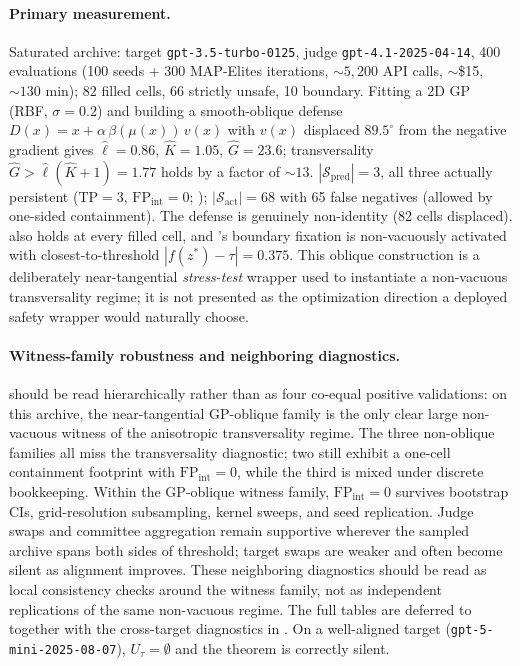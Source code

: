 \documentclass[11pt]{article}
\begin{document}
\paragraph{Primary measurement.}
Saturated archive: target \texttt{gpt-3.5-turbo-0125}, judge
\texttt{gpt-4.1-2025-04-14}, 400 evaluations (100 seeds + 300
MAP-Elites iterations, $\sim 5{,}200$ API calls, $\sim$\$15,
$\sim 130$ min); 82 filled cells, 66 strictly unsafe, 10 boundary.
Fitting a 2D GP (RBF, $\sigma=0.2$) and building a smooth-oblique
defense $D(x) = x + \alpha\,\beta(\mu(x))\,v(x)$ with $v(x)$ displaced
$89.5^\circ$ from the negative gradient gives
$\hat\ell = 0.86$, $\hat K = 1.05$, $\hat G = 23.6$; transversality
$\hat G > \hat\ell(\hat K{+}1) = 1.77$ holds by a factor of $\sim13$.
$|\mathcal{S}_{\text{pred}}| = 3$, all three actually persistent
($\mathrm{TP}=3$, $\mathrm{FP}_{\mathrm{int}}=0$;
); $|\mathcal{S}_{\text{act}}| = 68$
with 65 false negatives (allowed by one-sided containment). The defense
is genuinely non-identity (82 cells displaced). 
also holds at every filled cell, and 's boundary
fixation is non-vacuously activated with closest-to-threshold
$|f(z^*)-\tau| = 0.375$.
This oblique construction is a deliberately near-tangential
\emph{stress-test} wrapper used to instantiate a non-vacuous
transversality regime; it is not presented as the optimization
direction a deployed safety wrapper would naturally choose.

\paragraph{Witness-family robustness and neighboring diagnostics.}
 should be read hierarchically rather than
as four co-equal positive validations: on this archive, the
near-tangential GP-oblique family is the only clear large non-vacuous
witness of the anisotropic transversality regime. The three non-oblique
families all miss the transversality diagnostic; two still exhibit a
one-cell containment footprint with $\mathrm{FP}_{\mathrm{int}}=0$,
while the third is mixed under discrete bookkeeping. Within the
GP-oblique witness family,
$\mathrm{FP}_{\mathrm{int}}=0$ survives bootstrap CIs, grid-resolution
subsampling, kernel sweeps, and seed replication. Judge swaps and
committee aggregation remain supportive wherever the sampled archive
spans both sides of threshold; target swaps are weaker and often become
silent as alignment improves. These neighboring diagnostics should be
read as local consistency checks around the witness family, not as
independent replications of the same non-vacuous regime. The full
tables are deferred to
 together with the
cross-target diagnostics in . On a
well-aligned target (\texttt{gpt-5-mini-2025-08-07}), $U_\tau=\emptyset$
and the theorem is correctly silent.
\end{document}
